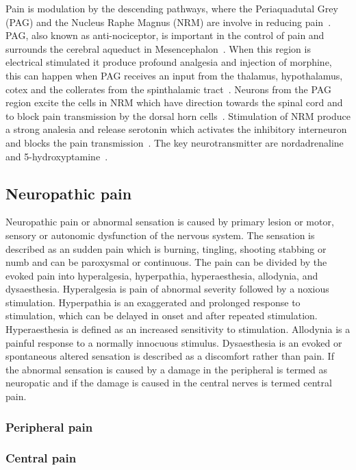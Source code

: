 Pain is modulation by the descending pathways, where the Periaquadutal Grey (PAG) and the Nucleus Raphe Magnus (NRM) are involve in reducing pain~\cite{Steeds2013}. PAG, also known as anti-nociceptor, is important in the control of pain and surrounds the cerebral aqueduct in Mesencephalon~\cite{Steeds2013}. When this region is electrical stimulated it produce profound analgesia and injection of morphine, this can happen when PAG receives an input from the thalamus, hypothalamus, cotex and the collerates from the spinthalamic tract~\cite{Steeds2013}. Neurons from the PAG region excite the cells in NRM which have direction towards the spinal cord and to block pain transmission by the dorsal horn cells~\cite{Steeds2013}. Stimulation of NRM produce a strong analesia 
and release serotonin which activates the inhibitory interneuron and blocks the pain transmission~\cite{Steeds2013}. The key neurotransmitter are nordadrenaline and 5-hydroxyptamine~\cite{Steeds2013}. 

\subsection{Neuropathic pain}
Neuropathic pain or abnormal sensation is caused by primary lesion or motor, sensory or autonomic dysfunction of the nervous system.
The sensation is described as an sudden pain which is burning, tingling, shooting stabbing or numb and can be paroxysmal or continuous. The pain can be divided by the evoked pain into hyperalgesia, hyperpathia, hyperaesthesia, allodynia, and dysaesthesia. Hyperalgesia is pain of abnormal severity followed by a noxious stimulation. Hyperpathia is an exaggerated and prolonged response to stimulation, which can be delayed in onset and after repeated stimulation. Hyperaesthesia is defined as an increased sensitivity to stimulation. Allodynia is a painful response to a normally innocuous stimulus. Dysaesthesia is an evoked or spontaneous altered sensation is described as a discomfort rather than pain. 
If the abnormal sensation is caused by a damage in the peripheral is termed as neuropatic and if the damage is caused in the central nerves is termed central pain. 

\subsubsection{Peripheral pain}


\subsubsection{Central pain}
%
%
%
